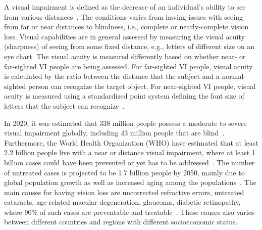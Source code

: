 A visual impairment is defined as the decrease of an individual's ability to see from various distances~\cite{who2022international}. The conditions varies from having issues with seeing from far or near distances to blindness, i.e., complete or nearly-complete vision loss. Visual capabilities are in general assessed by measuring the visual acuity (sharpness) of seeing from some fixed distance, e.g., letters of different size on an eye chart. 
The visual acuity is measured differently based on whether near- or far-sighted VI people are being assessed. For far-sighted VI people, visual acuity is calculated by the ratio between the distance that the subject and a normal-sighted person can recognize the target object.
For near-sighted VI people, visual acuity is measured using a standardized point system defining the font size of letters that the subject can recognize~\cite{who2019world}.



In 2020, it was estimated that 338 million people possess a moderate to severe visual impairment globally, including 43 million people that are blind~\cite{bourne2021trends}. Furthermore, the World Health Organization (WHO) have estimated that at least 2.2 billion people live with a near or distance visual impairment, where at least 1 billion cases could have been prevented or yet has to be addressed~\cite{who2019world}. The number of untreated cases is projected to be 1.7 billion people by 2050, mainly due to global population growth as well as increased aging among the populations~\cite{bourne2021trends}. 
The main causes for having vision loss are uncorrected refractive errors, untreated cataracts, age-related macular degeneration, glaucoma, diabetic retinopathy, where 90\% of such cases are preventable and treatable~\cite{steinmetz2021causes}. These causes also varies between different countries and regions with different socioeconomic status.  

